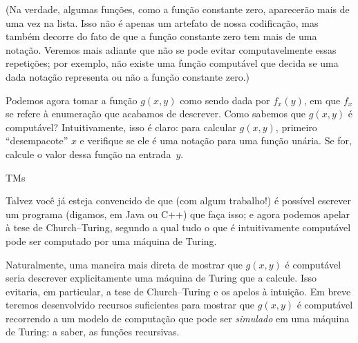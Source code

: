 \documentclass[../../../include/open-logic-section]{subfiles}
\begin{document}
(Na verdade, algumas funções, como a função constante zero, aparecerão
mais de uma vez na lista. Isso não é apenas um artefato de nossa
codificação, mas também decorre do fato de que a função constante zero
tem mais de uma notação. Veremos mais adiante que não se pode evitar
computavelmente essas repetições; por exemplo, não existe uma função
computável que decida se uma dada notação representa ou não a função
constante zero.)

Podemos agora tomar a função $g(x,y)$ como sendo dada por $f_x(y)$,
em que $f_x$ se refere à enumeração que acabamos de descrever. Como
sabemos que $g(x,y)$ é computável? Intuitivamente, isso é claro: para
calcular $g(x,y)$, primeiro ``desempacote'' $x$ e verifique se ele é
uma notação para uma função unária. Se for, calcule o valor dessa função
na entrada~$y$.

\begin{tagblock}{TMs}
\begin{digress}
Talvez você já esteja convencido de que (com algum trabalho!) é possível
escrever um programa (digamos, em Java ou C++) que faça isso; e agora
podemos apelar à tese de Church--Turing, segundo a qual tudo o que é
intuitivamente computável pode ser computado por uma máquina de Turing.

Naturalmente, uma maneira mais direta de mostrar que $g(x,y)$ é
computável seria descrever explicitamente uma máquina de Turing que a
calcule. Isso evitaria, em particular, a tese de Church--Turing e os
apelos à intuição. Em breve teremos desenvolvido recursos suficientes
para mostrar que $g(x,y)$ é computável recorrendo a um modelo de
computação que pode ser \emph{simulado} em uma máquina de Turing:
a saber, as funções recursivas.
\end{digress}
\end{tagblock}
\end{document}
